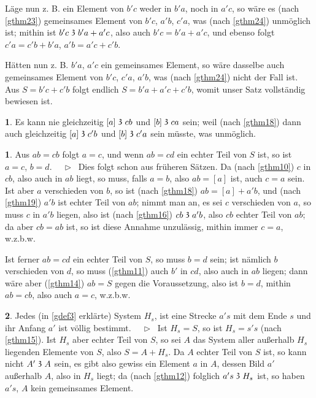 \documentclass[leqno,hidelinks,10pt]{article}
\theoremstyle{definition}
\newtheorem{satz}{\protect\satzname}
\newtheorem*{zusatz}{\protect\zusatzname}
\newcommand{\satzname}{}
\newcommand{\zusatzname}{}
\renewcommand{\satzname}{\hspace{-4pt}.\ Satz}%
\renewcommand{\zusatzname}{Zusatz}%
\renewcommand{\satzname}{\hspace{-4pt}.\ Theorem}%
\renewcommand{\zusatzname}{Corollary}%
\newcommand\Beweis{\medskip \newline $ \phantom{'.'} \rhd \ $}%
\newcommand\TeilVon{\mathrel{\raisebox{0.45ex}{$\mathfrak{3}$}}}
\newcommand{\sref}[1]{\underline{\ref{#1}}}%
\begin{document}
\begin{paracol}{2}
\begin{leftcolumn}
Läge nun z. B. ein Element von $b'c$ weder in $b'a$, noch in $a'c$,
so wäre es (nach \sref{gthm23}) gemeinsames Element von $b'c$, $a'b$, $c'a$, was
(nach \sref{gthm24}) unmöglich ist; mithin ist $b'c \TeilVon b'a + a'c$, also
auch $b'c = b'a + a'c$, und ebenso folgt $c'a = c'b + b'a$, $a'b = a'c + c'b$.

Hätten nun z. B. $b'a$, $a'c$ ein gemeinsames Element, so wäre dasselbe
auch gemeinsames Element von $b'c$, $c'a$, $a'b$, was (nach \sref{gthm24})
nicht der Fall ist. Aus $S = b'c + c'b$ folgt endlich $S = b'a + a'c + c'b$,
womit unser Satz vollständig bewiesen ist.

\begin{zusatz}\label{zusatz2}
Es kann nie gleichzeitig $[a] \TeilVon cb$ und $[b] \TeilVon ca$ sein;
weil (nach \sref{gthm18}) dann auch gleichzeitig $[a] \TeilVon c'b$ und
$[b] \TeilVon c'a$  sein müsste, was unmöglich.
\end{zusatz}

\begin{satz}\label{gthm26}
Aus $ab = cb$ folgt $a = c$, und wenn $ab = cd$ ein echter Teil von $S$ ist,
so ist $a = c$, $b = d$.
\Beweis
Dies folgt schon aus früheren Sätzen. Da (nach \sref{gthm10}) $c$ in $cb$, also
auch in $ab$ liegt, so muss, falls $a = b$, also $ab = [a]$ ist, auch $c = a$ sein.
Ist aber $a$ verschieden von $b$, so ist (nach \sref{gthm18}) $ab = [a] + a'b$, und
(nach \sref{gthm19}) $a'b$ ist echter Teil von $ab$; nimmt man an, es sei $c$
verschieden von $a$, so muss $c$ in $a'b$ liegen, also ist (nach \sref{gthm16})
$cb \TeilVon a'b$, also $cb$ echter Teil von $ab$; da aber $cb = ab$ ist, so ist
diese Annahme unzulässig, mithin immer $c = a$, w.z.b.w.

Ist ferner $ab = cd$ ein echter Teil von $S$, so muss $b = d$ sein; ist nämlich
$b$ verschieden von $d$, so muss (\sref{gthm11}) auch $b'$ in $cd$, also auch in
$ab$ liegen; dann wäre aber (\sref{gthm14}) $ab = S$ gegen die Voraussetzung,
also ist $b = d$, mithin $ ab = cb$, also auch $a = c$, w.z.b.w.
\end{satz}

\begin{satz}\label{gthm27}
Jedes (in \sref{gdef3} erklärte) System $H_s$, ist eine Strecke $a's$ mit dem
Ende $s$ und ihr Anfang $a'$ ist völlig bestimmt.
\Beweis
Ist $H_s= S$, so ist $H_s= s's$ (nach \sref{gthm15}). Ist $H_s$ aber echter Teil
von $S$, so sei $A$ das System aller außerhalb $H_s$ liegenden Elemente von $S$,
also $S = A + H_s$. Da $A$ echter Teil von $S$ ist, so kann nicht $A' \TeilVon A$
sein, es gibt also gewiss ein Element $a$ in $A$, dessen Bild $a'$ außerhalb $A$,
also in $H_s$ liegt; da (nach \sref{gthm12}) folglich $a's \TeilVon H_s$ ist, so
haben $a's$, $A$ kein gemeinsames Element.


\end{satz}
\end{leftcolumn}
\end{paracol}
\end{document}
